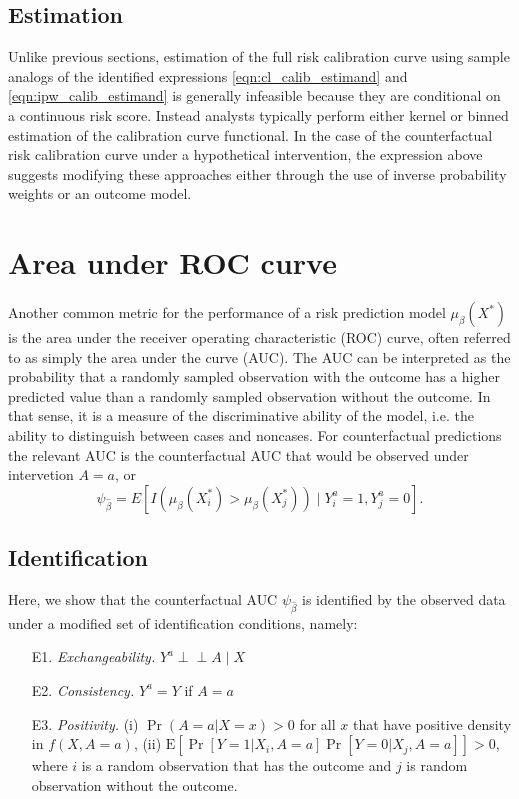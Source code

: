 \subsection{Estimation}
Unlike previous sections, estimation of the full risk calibration curve using sample analogs of the identified expressions \ref{eqn:cl_calib_estimand} and \ref{eqn:ipw_calib_estimand} is generally infeasible because they are conditional on a continuous risk score. Instead analysts typically perform either kernel or binned estimation of the calibration curve functional. In the case of the counterfactual risk calibration curve under a hypothetical intervention, the expression above suggests modifying these approaches either through the use of inverse probability weights or an outcome model. 


\section{Area under ROC curve}\label{sec:auc}
Another common metric for the performance of a risk prediction model $\mu_\beta(X^*)$ is the area under the receiver operating characteristic (ROC) curve, often referred to as simply the area under the curve (AUC). The AUC can be interpreted as the probability that a randomly sampled observation with the outcome has a higher predicted value than a randomly sampled observation without the outcome. In that sense, it is a measure of the discriminative ability of the model, i.e. the ability to distinguish between cases and noncases. For counterfactual predictions the relevant AUC is the counterfactual AUC that would be observed under intervetion $A=a$, or
\begin{equation}\label{eqn:auc_estimand}
    \psi_{\widehat{\beta}} = E[I\left(\mu_\beta(X^*_i) > \mu_\beta(X^*_j)\right) \mid Y_i^a = 1, Y_j^a = 0].
\end{equation}

\subsection{Identification}
Here, we show that the counterfactual AUC $\psi_{\widehat{\beta}}$ is identified by the observed data under a modified set of identification conditions, namely:
\begin{enumerate}
    \item[E1.] \textit{Exchangeability.} $Y^a \perp\!\!\!\perp A \mid X$ 
    \item[E2.] \textit{Consistency.} $Y^a = Y$ if $A = a$
    \item[E3.] \textit{Positivity.} (i) $\Pr(A = a | X = x) > 0$ for all $x$ that have positive density in $f(X, A = a)$, (ii) $\mathrm{E}\left[\Pr[Y = 1 | X_i, A = a]\Pr[Y = 0 | X_j, A = a]\right] > 0 $, where $i$ is a random observation that has the outcome and $j$ is random observation without the outcome.
\end{enumerate}



